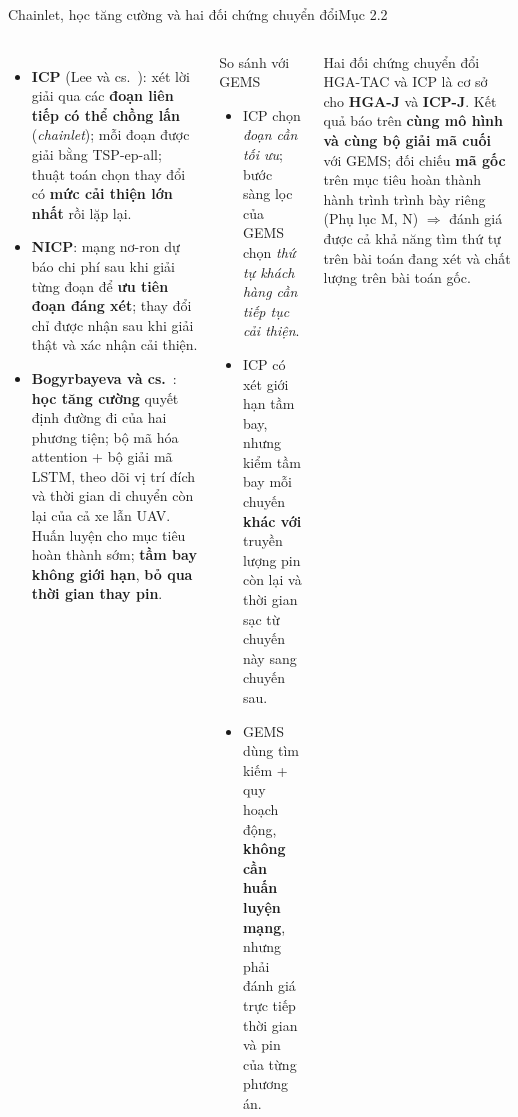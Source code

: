 \documentclass[aspectratio=169,10pt,t,xcolor={table}]{beamer}
\newcommand{\src}[1]{\hfill{\normalfont\footnotesize\color{white!62!navy}#1}}  %
\begin{document}
\begin{frame}{Chainlet, học tăng cường và hai đối chứng chuyển đổi\src{Mục 2.2}}
\begin{columns}[T,onlytextwidth]
\begin{itemize}\scriptsize
\item \textbf{ICP} (Lee và cs.~\cite{lee2025}): xét lời giải qua các \textbf{đoạn liên tiếp có thể chồng lấn} (\emph{chainlet}); mỗi đoạn được giải bằng TSP-ep-all; thuật toán chọn thay đổi có \textbf{mức cải thiện lớn nhất} rồi lặp lại.
\item \textbf{NICP}: mạng nơ-ron dự báo chi phí sau khi giải từng đoạn để \textbf{ưu tiên đoạn đáng xét}; thay đổi chỉ được nhận sau khi giải thật và xác nhận cải thiện.
\item \textbf{Bogyrbayeva và cs.}~\cite{bogyrbayeva2023}: \textbf{học tăng cường} quyết định đường đi của hai phương tiện; bộ mã hóa attention + bộ giải mã LSTM, theo dõi vị trí đích và thời gian di chuyển còn lại của cả xe lẫn UAV. Huấn luyện cho mục tiêu hoàn thành sớm; \textbf{tầm bay không giới hạn}, \textbf{bỏ qua thời gian thay pin}.
\end{itemize}
\begin{block}{So sánh với GEMS}
\scriptsize
\begin{itemize}
\item ICP chọn \emph{đoạn cần tối ưu}; bước sàng lọc của GEMS chọn \emph{thứ tự khách hàng cần tiếp tục cải thiện}.
\item ICP có xét giới hạn tầm bay, nhưng kiểm tầm bay mỗi chuyến \textbf{khác với} truyền lượng pin còn lại và thời gian sạc từ chuyến này sang chuyến sau.
\item GEMS dùng tìm kiếm + quy hoạch động, \textbf{không cần huấn luyện mạng}, nhưng phải đánh giá trực tiếp thời gian và pin của từng phương án.
\end{itemize}
\end{block}
\begin{alertblock}{Hai đối chứng chuyển đổi}
\scriptsize HGA-TAC và ICP là cơ sở cho \textbf{HGA-J} và \textbf{ICP-J}. Kết quả báo trên \textbf{cùng mô hình và cùng bộ giải mã cuối} với GEMS; đối chiếu \textbf{mã gốc} trên mục tiêu hoàn thành hành trình trình bày riêng (Phụ lục M, N) $\Rightarrow$ đánh giá được cả khả năng tìm thứ tự trên bài toán đang xét và chất lượng trên bài toán gốc.
\end{alertblock}
\end{columns}
\end{frame}
\end{document}

